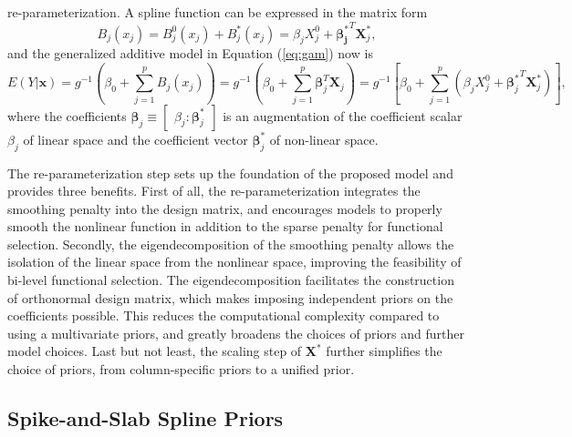 \documentclass[AMA,STIX1COL,]{WileyNJD-v2}
\begin{document}
re-parameterization. A spline function can be expressed in the matrix
form \[
B_j(x_j) = B_j^0(x_j) + B_j^*(x_j) = \beta_j X^0_j + \boldsymbol{\beta_j^*}^T \boldsymbol{X}_j^*,
\] and the generalized additive model in Equation (\ref{eq:gam}) now is
\begin{equation}\label{eq:gam-repa}
E(Y|\boldsymbol{x}) = g^{-1}(\beta_0 + \sum\limits^p_{j=1} B_j(x_j)) = g^{-1}(\beta_0 + \sum\limits^p_{j=1} \boldsymbol{\beta}_j^T \boldsymbol{X}_j) = g^{-1}\left[\beta_0 + \sum\limits^p_{j=1} (\beta_j X^0_j + {\boldsymbol{\beta}_j^*}^T \boldsymbol{X}_j^*)\right],
\end{equation} where the coefficients
\(\boldsymbol{\beta}_j \equiv \begin{bmatrix} \beta_j : \boldsymbol{\beta}^*_j \end{bmatrix}\)
is an augmentation of the coefficient scalar \(\beta_j\) of linear space
and the coefficient vector \(\boldsymbol{\beta}^*_j\) of non-linear
space.

The re-parameterization step sets up the foundation of the proposed
model and provides three benefits. First of all, the re-parameterization
integrates the smoothing penalty into the design matrix, and encourages
models to properly smooth the nonlinear function in addition to the
sparse penalty for functional selection. Secondly, the
eigendecomposition of the smoothing penalty allows the isolation of the
linear space from the nonlinear space, improving the feasibility of
bi-level functional selection. The eigendecomposition facilitates the
construction of orthonormal design matrix, which makes imposing
independent priors on the coefficients possible. This reduces the
computational complexity compared to using a multivariate priors, and
greatly broadens the choices of priors and further model choices. Last
but not least, the scaling step of \(\boldsymbol{X}^*\) further
simplifies the choice of priors, from column-specific priors to a
unified prior.

\subsection{Spike-and-Slab Spline Priors}
\end{document}
